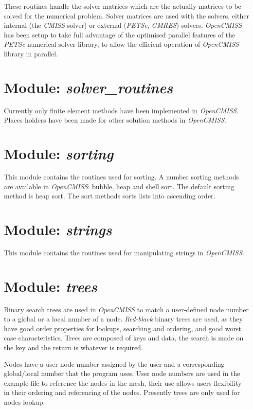 These routines handle the solver matrices which are the actually matrices to 
be solved for the numerical problem. Solver matrices are used with the solvers, 
either internal (the \emph{CMISS} solver) or external (\emph{PETSc}, 
\emph{GMRES}) solvers. \emph{OpenCMISS} has been setup to take full advantage of 
the optimised parallel features of the \emph{PETSc} numerical solver library, to  
allow the efficient operation of \emph{OpenCMISS} library in parallel.


\section{Module: \emph{solver\_routines}}
\label{sec:solverroutines}

Currently only finite element methods have been implemented in \emph{OpenCMISS}. 
Places holders have been made for other solution methods in \emph{OpenCMISS}.


\section{Module: \emph{sorting}}
\label{sec:sorting}

This module contains the routines used for sorting. A number sorting methods 
are available in \emph{OpenCMISS}: bubble, heap and shell sort. The default 
sorting method is heap sort. The sort methods sorts lists into ascending order. 


\section{Module: \emph{strings}}
\label{sec:strings}

This module contains the routines used for manipulating strings in 
\emph{OpenCMISS}.


\section{Module: \emph{trees}}
\label{sec:trees}

Binary search trees are used in \emph{OpenCMISS} to match a user-defined node 
number to a global or a local number of a node. \emph{Red-black} binary trees 
are used, as they have good order properties for lookups, searching and 
ordering, and good worst case characteristics. Trees are composed of keys and 
data, the search is made on the key and the return is whatever is required.

Nodes have a user node number assigned by the user and a corresponding 
global/local number that the program uses. User node numbers are used in the 
example file to reference the nodes in the mesh, their use allows users 
flexibility in their ordering and referencing of the nodes. Presently trees 
are only used for nodes lookup.

